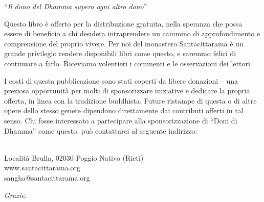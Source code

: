 
\thispagestyle{empty}

\newsavebox{\giftofdhammabox}

\begin{lrbox}{\giftofdhammabox}\begin{minipage}{\linewidth}
{\setlength{\parskip}{\baselineskip}
\centering

``\emph{\large Il dono del Dhamma supera ogni altro dono}''

Questo libro è offerto per la distribuzione gratuita, nella speranza che
possa essere di beneficio a chi desidera intraprendere un cammino di
approfondimento e comprensione del proprio vivere. Per noi del monastero
Santacittarama è un grande privilegio rendere disponibili libri come
questo, e saremmo felici di continuare a farlo. Riceviamo volentieri i
commenti e le osservazioni dei lettori.

I costi di questa pubblicazione sono stati coperti da libere donazioni
-- una preziosa opportunità per molti di sponsorizzare iniziative e
dedicare la propria offerta, in linea con la tradizione buddhista.
Future ristampe di questa o di altre opere dello stesso genere dipendono
direttamente dai contributi offerti in tal senso. Chi fosse interessato
a partecipare alla sponsorizzazione di ``Doni di Dhamma'' come questo,
può contattarci al seguente indirizzo:

\\[0.2\baselineskip]
Località Brulla, 02030 Poggio Nativo (Rieti)\\
www.santacittarama.org\\
sangha@santacittarama.org

\emph{Grazie}.

}
\end{minipage}\end{lrbox}%
